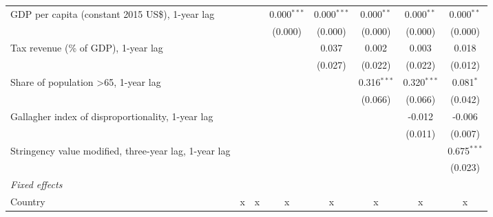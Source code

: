 \begin{tabular}{lccccccc}
   GDP per capita (constant 2015 US\$), 1-year lag                                           &             &              & 0.000$^{***}$ & 0.000$^{***}$ & 0.000$^{**}$  & 0.000$^{**}$  & 0.000$^{**}$\\   
                                                                                             &             &              & (0.000)       & (0.000)       & (0.000)       & (0.000)       & (0.000)\\   
   Tax revenue (\% of GDP), 1-year lag                                                       &             &              &               & 0.037         & 0.002         & 0.003         & 0.018\\   
                                                                                             &             &              &               & (0.027)       & (0.022)       & (0.022)       & (0.012)\\   
   Share of population >65, 1-year lag                                                       &             &              &               &               & 0.316$^{***}$ & 0.320$^{***}$ & 0.081$^{*}$\\   
                                                                                             &             &              &               &               & (0.066)       & (0.066)       & (0.042)\\   
   Gallagher index of disproportionality, 1-year lag                                         &             &              &               &               &               & -0.012        & -0.006\\   
                                                                                             &             &              &               &               &               & (0.011)       & (0.007)\\   
   Stringency value modified, three-year lag, 1-year lag                                     &             &              &               &               &               &               & 0.675$^{***}$\\   
                                                                                             &             &              &               &               &               &               & (0.023)\\   
   \emph{Fixed effects}\\
   Country                                                                                   & x           & x            & x             & x             & x             & x             & x\\  

\end{tabular}
